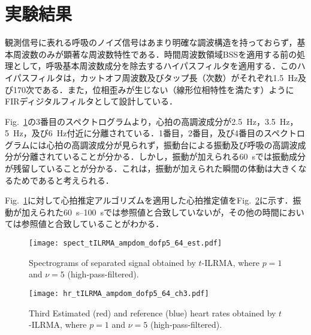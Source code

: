 \documentclass[a4j]{jsarticle}
\begin{document}
\section{実験結果}
観測信号に表れる呼吸のノイズ信号はあまり明確な調波構造を持っておらず，基本周波数のみが顕著な周波数特性である．時間周波数領域BSSを適用する前の処理として，呼吸基本周波数成分を除去するハイパスフィルタを適用する．このハイパスフィルタは，カットオフ周波数及びタップ長（次数）がそれぞれ1.5~Hz及び170次である．また，位相歪みが生じない（線形位相特性を満たす）ようにFIRディジタルフィルタとして設計している．

Fig.~\ref{fig:stilrmaa5}の3番目のスペクトログラムより，心拍の高調波成分が2.5~Hz，3.5~Hz，5~Hz，及び6~Hz付近に分離されている．1番目，2番目，及び4番目のスペクトログラムには心拍の高調波成分が見られず，振動台による振動及び呼吸の高調波成分が分離されていることが分かる．しかし，振動が加えられる60~sでは振動成分が残留していることが分かる．これは，振動が加えられた瞬間の体動は大きくなるためであると考えられる．

Fig.~\ref{fig:stilrmaa5}に対して心拍推定アルゴリズムを適用した心拍推定値をFig.~\ref{fig:hrtilrmaa5}に示す．振動が加えられた60~s--100~sでは参照値と合致していないが，その他の時間においては参照値と合致していることがわかる．

\begin{figure}[t]
  \centering
  \vspace{0pt} %
  \texttt{[image: spect\_tILRMA\_ampdom\_dofp5\_64\_est.pdf]}
  \vspace{0pt} %
  \caption{Spectrograms of separated signal obtained by $t$-ILRMA, where $p=1$ and $\nu=5$ (high-pass-filtered).}
  \vspace{-5pt} %
  \label{fig:stilrmaa5}
\end{figure}

\begin{figure}[t]
  \centering
  \vspace{-10pt} %
  \texttt{[image: hr\_tILRMA\_ampdom\_dofp5\_64\_ch3.pdf]}
  \vspace{-10pt} %
  \caption{Third Estimated (red) and reference (blue) heart rates obtained by $t$-ILRMA, where $p=1$ and $\nu=5$ (high-pass-filtered).}
  \vspace{-20pt} %
  \label{fig:hrtilrmaa5}
\end{figure}
\end{document}
